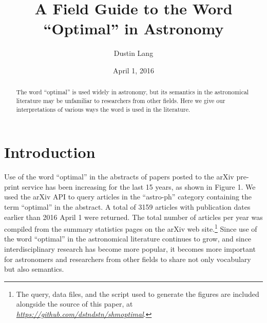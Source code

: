 \documentclass[12pt, preprint]{aastex}
\newcommand{\niceurl}[1]{\href{#1}{\textsl{#1}}}
\begin{document}
\title{A Field Guide to the Word ``Optimal'' in Astronomy}

\author{%
Dustin Lang%
}
\date{\centering April 1, 2016}

\begin{abstract}
The word ``optimal'' is used widely in astronomy, but its semantics
in the astronomical literature
may be unfamiliar to researchers from other fields.  Here we give
our interpretations of various ways the word is used in the literature.
\end{abstract}


\section{Introduction}

Use of the word ``optimal'' in the abstracts of papers posted to the
arXiv pre-print service has been increasing for the last 15 years, as
shown in Figure 1.  We used the arXiv API to query articles in the
``astro-ph'' category containing the term ``optimal'' in the abstract.
A total of 3159 articles with publication dates earlier than 2016
April 1 were returned.  The total number of articles per year was
compiled from the summary statistics pages on the arXiv web site.\footnote{%
  The query, data files, and the script used to generate the figures are included
  alongside the source of this paper, at \niceurl{https://github.com/dstndstn/shmoptimal}.}
Since use of the word ``optimal'' in the astronomical literature continues
to grow, and since interdisciplinary research has become more popular,
it becomes more important for astronomers and researchers from other fields
to share not only vocabulary but also semantics.
\end{document}
